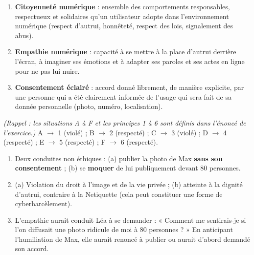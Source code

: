 \documentclass[11pt]{article}
\newcommand{\cle}[1]{{\popxbold\color{popdark}#1}}
\begin{document}
\begin{corrige}
\begin{enumerate}
\item \textbf{\cle{Citoyenneté numérique}} : ensemble des comportements responsables, respectueux et solidaires qu'un utilisateur adopte dans l'environnement numérique (respect d'autrui, honnêteté, respect des lois, signalement des abus).
\item \textbf{\cle{Empathie numérique}} : capacité à se mettre à la place d'autrui derrière l'écran, à imaginer ses émotions et à adapter ses paroles et ses actes en ligne pour ne pas lui nuire.
\item \textbf{\cle{Consentement éclairé}} : accord donné librement, de manière explicite, par une personne qui a été clairement informée de l'usage qui sera fait de sa donnée personnelle (photo, numéro, localisation).
\end{enumerate}
\end{corrige}

\begin{corrige}
\emph{(Rappel : les situations A à F et les principes 1 à 6 sont définis dans l'énoncé de l'exercice.)}
A $\rightarrow$ 1 (violé) ; B $\rightarrow$ 2 (respecté) ; C $\rightarrow$ 3 (violé) ; D $\rightarrow$ 4 (respecté) ; E $\rightarrow$ 5 (respecté) ; F $\rightarrow$ 6 (respecté).
\end{corrige}

\begin{corrige}
\begin{enumerate}
\item Deux conduites non éthiques : (a) publier la photo de Max \textbf{sans son consentement} ; (b) se \textbf{moquer} de lui publiquement devant 80 personnes.
\item (a) Violation du \cle{droit à l'image} et de la \cle{vie privée} ; (b) atteinte à la \cle{dignité} d'autrui, contraire à la \cle{Netiquette} (cela peut constituer une forme de \cle{cyberharcèlement}).
\item L'empathie aurait conduit Léa à se demander : « Comment me sentirais-je si l'on diffusait une photo ridicule de moi à 80 personnes ? » En anticipant l'humiliation de Max, elle aurait renoncé à publier ou aurait d'abord demandé son accord.
\end{enumerate}
\end{corrige}
\end{document}
